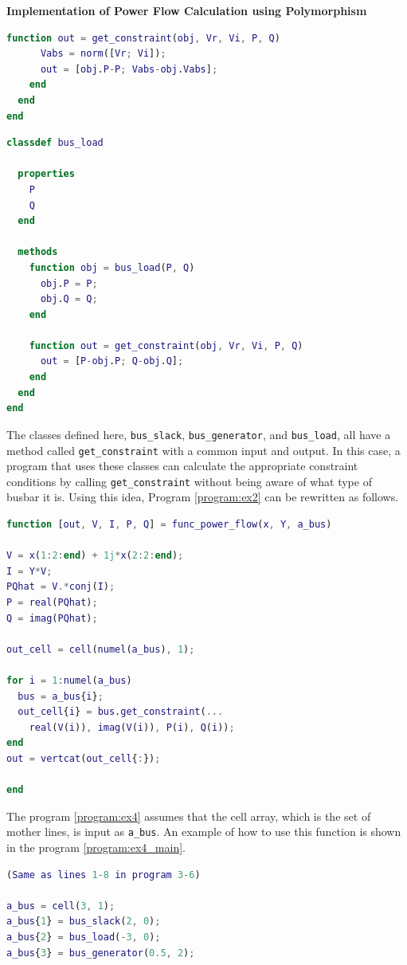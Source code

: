 \documentclass[graybox, envcountchap]{svmult}
\begin{document}
\begin{example}{\textbf{Implementation of Power Flow Calculation using Polymorphism}}
\begin{lstlisting}[language=Matlab, caption=bus\_generator.m, label={program:bus_PV}]
    function out = get_constraint(obj, Vr, Vi, P, Q)
      Vabs = norm([Vr; Vi]);
      out = [obj.P-P; Vabs-obj.Vabs];
    end
  end
end
\end{lstlisting}

\begin{lstlisting}[language=Matlab, caption=bus\_load.m, label={program:bus_PQ}]
classdef bus_load
  
  properties
    P
    Q
  end
  
  methods
    function obj = bus_load(P, Q)
      obj.P = P;
      obj.Q = Q;
    end
    
    function out = get_constraint(obj, Vr, Vi, P, Q)
      out = [P-obj.P; Q-obj.Q];
    end
  end
end
\end{lstlisting}

The classes defined here, \verb|bus_slack|, \verb|bus_generator|, and
\verb|bus_load|, all have a method called \verb|get_constraint| with a common
input and output. In this case, a program that uses these classes can calculate
the appropriate constraint conditions by calling \verb|get_constraint| without
being aware of what type of busbar it is. Using this idea, Program
\ref{program:ex2} can be rewritten as follows.

\begin{lstlisting}[language=Matlab, caption=func\_power\_flow.m, label={program:ex4}]
function [out, V, I, P, Q] = func_power_flow(x, Y, a_bus)

V = x(1:2:end) + 1j*x(2:2:end);
I = Y*V;
PQhat = V.*conj(I);
P = real(PQhat);
Q = imag(PQhat);

out_cell = cell(numel(a_bus), 1);

for i = 1:numel(a_bus)
  bus = a_bus{i};
  out_cell{i} = bus.get_constraint(...
    real(V(i)), imag(V(i)), P(i), Q(i));
end
out = vertcat(out_cell{:});

end
\end{lstlisting}

The program \nobreak\ref{program:ex4} assumes that the cell array, which is the
set of mother lines, is input as \verb|a_bus|. An example of how to use this
function is shown in the program \nobreak\ref{program:ex4_main}.

\begin{lstlisting}[language=Matlab, caption=main\_ex4.m, label={program:ex4_main}]
(Same as lines 1-8 in program 3-6)

a_bus = cell(3, 1);
a_bus{1} = bus_slack(2, 0);
a_bus{2} = bus_load(-3, 0);
a_bus{3} = bus_generator(0.5, 2);


\end{lstlisting}
\end{example}
\end{document}
